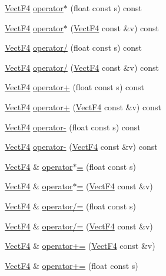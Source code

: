 \begin{DoxyCompactItemize}
\item 
\hyperlink{classVectF4}{Vect\-F4} \hyperlink{classVectF4_a63e5322720c3fb33b923761718efcc75}{operator$\ast$} (float const s) const 
\item 
\hyperlink{classVectF4}{Vect\-F4} \hyperlink{classVectF4_a65fbdff2d59eea6cc389fb9404ee4b02}{operator$\ast$} (\hyperlink{classVectF4}{Vect\-F4} const \&v) const 
\item 
\hyperlink{classVectF4}{Vect\-F4} \hyperlink{classVectF4_ac76344ea9a90243ca059e29ff339cea6}{operator/} (float const s) const 
\item 
\hyperlink{classVectF4}{Vect\-F4} \hyperlink{classVectF4_a96b41294be2037475c3c6b48007b03ff}{operator/} (\hyperlink{classVectF4}{Vect\-F4} const \&v) const 
\item 
\hyperlink{classVectF4}{Vect\-F4} \hyperlink{classVectF4_a40ace2799d699893a093344a4ab0696d}{operator+} (float const s) const 
\item 
\hyperlink{classVectF4}{Vect\-F4} \hyperlink{classVectF4_abcd0acf38051750ba6d0550c75a62937}{operator+} (\hyperlink{classVectF4}{Vect\-F4} const \&v) const 
\item 
\hyperlink{classVectF4}{Vect\-F4} \hyperlink{classVectF4_ab67ca018a5fbbc0aa59a8b763c209f1e}{operator-\/} (float const s) const 
\item 
\hyperlink{classVectF4}{Vect\-F4} \hyperlink{classVectF4_a8befde74d5ddc2a693146a9ea37b46db}{operator-\/} (\hyperlink{classVectF4}{Vect\-F4} const \&v) const 
\item 
\hyperlink{classVectF4}{Vect\-F4} \& \hyperlink{classVectF4_a33f7ca1941f18594b2ff71faf4d8908e}{operator$\ast$=} (float const s)
\item 
\hyperlink{classVectF4}{Vect\-F4} \& \hyperlink{classVectF4_aef2fa4ebe18fc0bb90950762772e859a}{operator$\ast$=} (\hyperlink{classVectF4}{Vect\-F4} const \&v)
\item 
\hyperlink{classVectF4}{Vect\-F4} \& \hyperlink{classVectF4_a8d6387bbdb7bbfd895b1c124b22abd7f}{operator/=} (float const s)
\item 
\hyperlink{classVectF4}{Vect\-F4} \& \hyperlink{classVectF4_ae41ec847549ffae2075b4c4b3e8521d9}{operator/=} (\hyperlink{classVectF4}{Vect\-F4} const \&v)
\item 
\hyperlink{classVectF4}{Vect\-F4} \& \hyperlink{classVectF4_a1266e6ad773417a6d99833b0e8e5537a}{operator+=} (\hyperlink{classVectF4}{Vect\-F4} const \&v)
\item 
\hyperlink{classVectF4}{Vect\-F4} \& \hyperlink{classVectF4_a70d997f8fb27a6c2036e05b740be7946}{operator+=} (float const s)

\end{DoxyCompactItemize}
